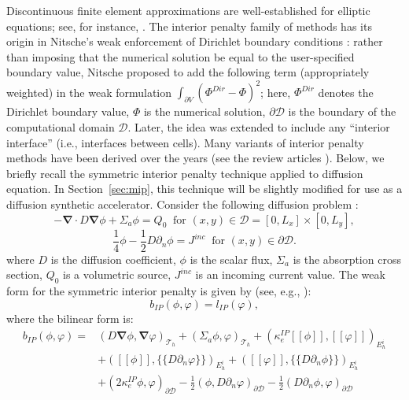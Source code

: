 \documentclass{mc2013}
\newcommand\bn{\boldsymbol{\nabla}}
\newcommand{\jmp}[1]{[\![#1]\!]}                     %
\newcommand{\mvl}[1]{\{\!\!\{#1\}\!\!\}}             %
\newcommand\tf{\varphi}
\newcommand\mc{\mathcal}
\renewcommand{\(}{\left(}
\renewcommand{\)}{\right)}
\renewcommand{\[}{\left[}
\renewcommand{\]}{\right]}
\begin{document}
Discontinuous finite element approximations are well-established for elliptic equations; see, for
instance, \cite{Kanschat2007}. The interior penalty family of methods has its origin in Nitsche's weak enforcement
of Dirichlet boundary conditions \cite{nitsche}: rather than imposing that the numerical solution be equal to the
user-specified boundary value, Nitsche proposed to add the following term (appropriately weighted) 
in the weak formulation $\int_{\partial V} (\Phi^{Dir}-\Phi)^2$; 
here, $\Phi^{Dir}$ denotes the Dirichlet boundary value, $\Phi$ is the numerical 
solution, $\partial \mc{D}$ is the boundary of the computational domain $\mc{D}$. Later, the idea was extended to
include any ``interior interface'' (i.e., interfaces between cells). Many variants of interior penalty methods have
been derived over the years (see the review articles \cite{Kanschat2007,ip-review}). Below, we briefly
recall the symmetric interior penalty technique applied to diffusion equation. In Section~\ref{sec:mip},
this technique will be slightly modified for use as a diffusion synthetic accelerator.
%
%
Consider the following diffusion problem :
\begin{equation}
  -\bn \cdot D \bn \phi + \Sigma_a \phi = Q_0\ \textrm{ for } (x,y) \in \mc{D}=[0,L_x]\times[0,L_y],
\end{equation}
\begin{equation}
\frac{1}{4}\phi - \frac{1}{2} D \partial_n \phi =J^{inc}\ \textrm{ for } (x,y) \in \partial \mc{D}.
\end{equation}
%
where $D$ is the diffusion coefficient, $\phi$ is the scalar flux, $\Sigma_a$
is the absorption cross section, $Q_0$ is a volumetric source, $J^{inc}$ is an
incoming current value. The weak form for the symmetric interior penalty is given by (see, e.g., \cite{Kanschat2007}):
\begin{equation}
\label{eq:ip-form}
  b_{IP}(\phi,\tf) = l_{IP}(\tf),
\end{equation}
where the bilinear form is:
\begin{equation}
\label{eq:matrix-ip-form}
  \begin{split}
    b_{IP} (\phi,\tf) =& \(D\bn\phi,\bn \tf\)_{\mc{T}_h} + \(\Sigma_a \phi,\tf\)_{\mc{T}_h}  +
    (\kappa_e^{IP}\jmp{\phi},\jmp{\tf})_{E_h^i}\\
    &+ \( \jmp{\phi}, \mvl{D\partial_n \tf}\)_{E_h^i}
     + \( \jmp{\tf}, \mvl{D\partial_n \phi}\)_{E_h^i} \\
    &+ \(2\kappa_e^{IP} \phi, \tf \)_{\partial \mc{D}}
    -\frac{1}{2}\(\phi,D\partial_n \tf\)_{\partial \mc{D}}
    -\frac{1}{2}\(D\partial_n\phi,\tf\)_{\partial \mc{D}}
  \end{split}
\end{equation}
\end{document}
